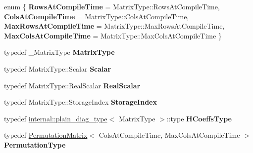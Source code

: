 \begin{DoxyCompactItemize}
\item 
\mbox{\label{class_eigen_1_1_complete_orthogonal_decomposition_af81a1267f1e3cb95aca86c32ddd55d4b}} 
enum \{ {\bfseries Rows\+At\+Compile\+Time} = Matrix\+Type\+::Rows\+At\+Compile\+Time, 
{\bfseries Cols\+At\+Compile\+Time} = Matrix\+Type\+::Cols\+At\+Compile\+Time, 
{\bfseries Max\+Rows\+At\+Compile\+Time} = Matrix\+Type\+::Max\+Rows\+At\+Compile\+Time, 
{\bfseries Max\+Cols\+At\+Compile\+Time} = Matrix\+Type\+::Max\+Cols\+At\+Compile\+Time
 \}
\item 
\mbox{\label{class_eigen_1_1_complete_orthogonal_decomposition_a8eba7b5263a0241cb477b3531f5ef609}} 
typedef \+\_\+\+Matrix\+Type {\bfseries Matrix\+Type}
\item 
\mbox{\label{class_eigen_1_1_complete_orthogonal_decomposition_a1aa69ca9c8caf074891ed9177a754361}} 
typedef Matrix\+Type\+::\+Scalar {\bfseries Scalar}
\item 
\mbox{\label{class_eigen_1_1_complete_orthogonal_decomposition_aa9ac87cdab6bf619ca5802cca93ca4e1}} 
typedef Matrix\+Type\+::\+Real\+Scalar {\bfseries Real\+Scalar}
\item 
\mbox{\label{class_eigen_1_1_complete_orthogonal_decomposition_af255cba487b5513259359d5e27a68d73}} 
typedef Matrix\+Type\+::\+Storage\+Index {\bfseries Storage\+Index}
\item 
\mbox{\label{class_eigen_1_1_complete_orthogonal_decomposition_aca5b63fffae26e0e1eaa38d63b575038}} 
typedef \mbox{\hyperlink{struct_eigen_1_1internal_1_1plain__diag__type}{internal\+::plain\+\_\+diag\+\_\+type}}$<$ Matrix\+Type $>$\+::type {\bfseries H\+Coeffs\+Type}
\item 
\mbox{\label{class_eigen_1_1_complete_orthogonal_decomposition_ae60d0d820677d67b73258322bcae0a2d}} 
typedef \mbox{\hyperlink{class_eigen_1_1_permutation_matrix}{Permutation\+Matrix}}$<$ Cols\+At\+Compile\+Time, Max\+Cols\+At\+Compile\+Time $>$ {\bfseries Permutation\+Type}

\end{DoxyCompactItemize}
